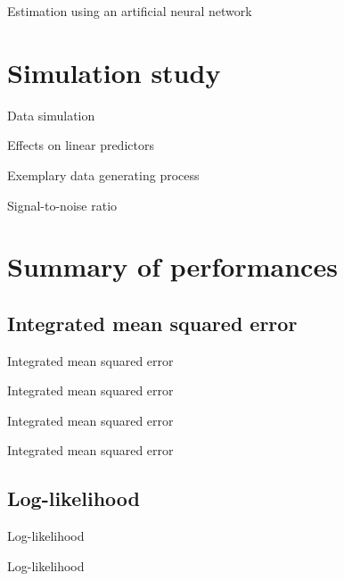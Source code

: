 \documentclass[xcolor=dvipsnames]{beamer}
\begin{document}
\begin{frame}{Estimation using an artificial neural network}
\end{frame}

\section{Simulation study}
\begin{frame}{Data simulation}
\end{frame}

\begin{frame}{Effects on linear predictors}
\end{frame}

\begin{frame}{Exemplary data generating process}
\end{frame}

\begin{frame}{Signal-to-noise ratio}
\end{frame}

\section{Summary of performances}
\subsection{Integrated mean squared error}
\begin{frame}{Integrated mean squared error}
\end{frame}

\begin{frame}{Integrated mean squared error}
\end{frame}

\begin{frame}{Integrated mean squared error}
\end{frame}

\begin{frame}{Integrated mean squared error}
\end{frame}

\subsection{Log-likelihood}
\begin{frame}{Log-likelihood}
\end{frame}

\begin{frame}{Log-likelihood}
\end{frame}
\end{document}
